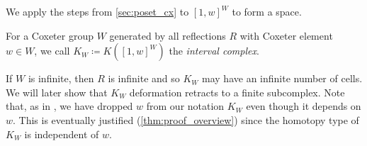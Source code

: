 \documentclass[class=article, crop=false]{standalone}
\begin{document}
We apply the steps from \cref{sec:poset_cx} to $[1,w]^W$ to form a space.

\begin{definition}
    For a Coxeter group $W$ generated by all reflections $R$ with Coxeter element $w \in W$, we call $K_{W} \coloneq K([1,w]^W)$ the \emph{interval complex}.
    \label{def:interval_complex}
\end{definition}

If $W$ is infinite, then $R$ is infinite and so $K_W$ may have an infinite number of cells. We will later show that $K_W$ deformation retracts to a finite subcomplex. Note that, as in \cite{paolini_salvetti_kpi1_2021}, we have dropped $w$ from our notation $K_{W}$ even though it depends on $w$. This is eventually justified (\cref{thm:proof_overview}) since the homotopy type of $K_W$ is independent of $w$.
\end{document}
